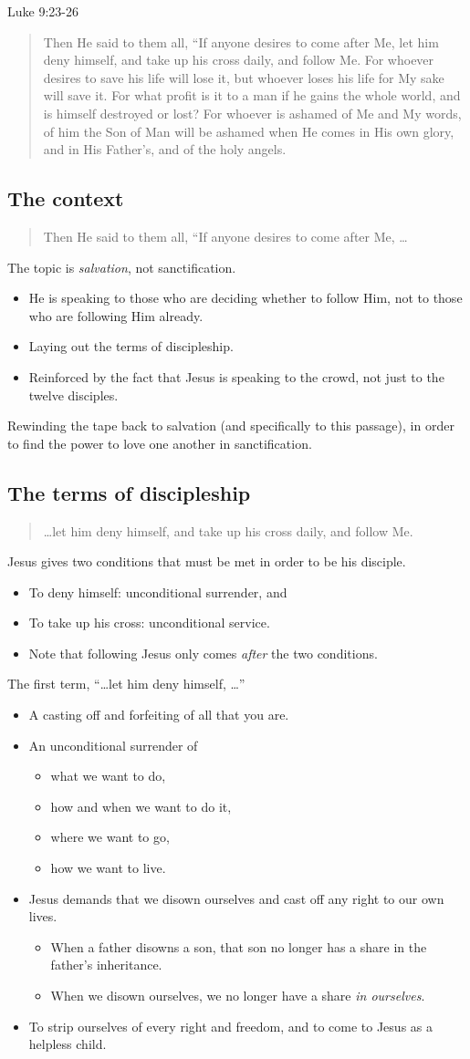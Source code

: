 \documentclass[12pt]{article}
\newcommand{\BI}{\begin{itemize}}
\newcommand{\EI}{\end{itemize}}
\newcommand{\I}{\item}
\newcommand{\Q}[1]{\begin{quote} #1 \end{quote}}
\begin{document}
\I  Luke 9:23-26
    \Q{ Then He said to them all, 
        ``If anyone desires to come after Me,
        let him deny himself, and take up his cross daily, and follow Me.
        For whoever desires to save his life will lose it,
        but whoever loses his life for My sake will save it.
        For what profit is it to a man if he gains the whole world,
        and is himself destroyed or lost?
        For whoever is ashamed of Me and My words,
        of him the Son of Man will be ashamed when He comes in His own glory,
        and in His Father's, and of the holy angels.}

\subsection{The context}
\Q{ Then He said to them all, ``If anyone desires to come after Me, \ldots}
\I  The topic is \emph{salvation}, not sanctification.
\BI \I  He is speaking to those who are deciding whether to follow Him,
            not to those who are following Him already.
    \I  Laying out the terms of discipleship.
    \I  Reinforced by the fact that Jesus is speaking to the crowd, 
            not just to the twelve disciples. \EI
\I  Rewinding the tape back to salvation (and specifically to this passage), 
        in order to find the power to love one another in sanctification.

\subsection{The terms of discipleship}
\Q{ \ldots let him deny himself, and take up his cross daily, and follow Me.}
\I  Jesus gives two conditions that must be met in order to be his disciple.
\BI \I  To deny himself: unconditional surrender, and
    \I  To take up his cross: unconditional service.
    \I  Note that following Jesus only comes \emph{after} the two conditions. \EI

\I  The first term, ``\ldots let him deny himself, \ldots''
\BI \I  A casting off and forfeiting of all that you are.
    \I  An unconditional surrender of 
    \BI \I  what we want to do, 
        \I  how and when we want to do it,
        \I  where we want to go,
        \I  how we want to live. \EI
    \I  Jesus demands that we disown ourselves and 
            cast off any right to our own lives.
    \BI \I  When a father disowns a son, 
                that son no longer has a share in the father's inheritance.
        \I  When we disown ourselves,
                we no longer have a share \emph{in ourselves}. \EI
    \I  To strip ourselves of every right and freedom,
            and to come to Jesus as a helpless child. \EI
\end{document}
